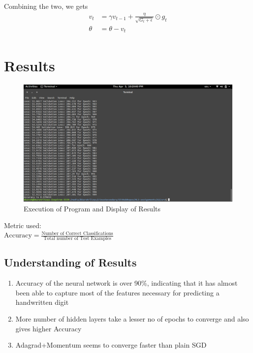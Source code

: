 \documentclass{article}
\begin{document}
Combining the two, we gets
\begin{align*}
	v_t    & = \gamma v_{t-1} + \displaystyle \frac{\eta}{\sqrt{G_t+\epsilon}} \odot g_t \\
	\theta & = \theta - v_t                                                              \\
\end{align*}

\section{Results}
\begin{figure}[H]
	\includegraphics[scale=0.5,trim={0 0.7cm 30cm 10cm},clip]{Results.png}
	\caption{Execution of Program and Display of Results}
\end{figure}
Metric used: \\
$\displaystyle \textrm{Accuracy}= \frac{\textrm{Number of Correct Classifications}}{\textrm{Total number of Test Examples}}$ \\

\subsection{Understanding of Results}
\begin{enumerate}
	
	\item Accuracy of the neural network is over 90\%, indicating that it has almost been able to capture most of the features necessary for 
	      predicting a handwritten digit
	\item More number of hidden layers take a lesser no of epochs to converge and also gives higher Accuracy
	\item Adagrad+Momentum seems to converge faster than plain SGD
\end{enumerate}
\end{document}
